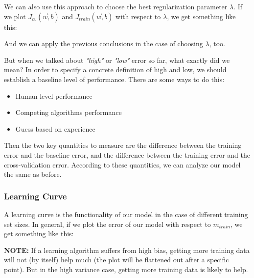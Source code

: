 \documentclass[a4paper, 12pt]{book}
\begin{document}
We can also use this approach to choose the best regularization parameter $\lambda$. If we plot $J_{cv}(\Vec{w},b)$ and $J_{train}(\Vec{w},b)$ with respect to $\lambda$, we get something like this:
\begin{center}
\end{center}
And we can apply the previous conclusions in the case of choosing $\lambda$, too.

But when we talked about \emph{"high"} or \emph{"low"} error so far, what exactly did we mean? In order to specify a concrete definition of high and low, we should establish a baseline level of performance. There are some ways to do this:
\begin{itemize}
    \item Human-level performance
    \item Competing algorithms performance
    \item Guess based on experience
\end{itemize}
Then the two key quantities to measure are the difference between the training error and the baseline error, and the difference between the training error and the cross-validation error. According to these quantities, we can analyze our model the same as before.

\subsubsection{Learning Curve}
A learning curve is the functionality of our model in the case of different training set sizes. In general, if we plot the error of our model with respect to $m_{train}$, we get something like this:

\begin{center}
\end{center}
\textbf{NOTE:} If a learning algorithm suffers from high bias, getting more training data will not (by itself) help much (the plot will be flattened out after a specific point). But in the high variance case, getting more training data is likely to help.
\end{document}
